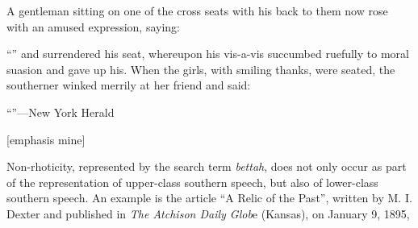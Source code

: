 \begin{ipquote}
A gentleman sitting on one of the cross seats with his back to them now rose with an amused expression, saying:

“” and surrendered his seat, whereupon his vis-a-vis succumbed ruefully to moral suasion and gave up his. When the girls, with smiling thanks, were seated, the southerner winked merrily at her friend and said:

{“”—New York Herald

\raggedleft
{[emphasis mine]}\\
}
\end{ipquote}

Non-rhoticity, represented by the search term \emph{bettah}, does not only occur as part of the representation of upper-class southern speech, but also of lower-class southern speech. An example is the article “A Relic of the Past”, written by M. I. Dexter and published in \emph{The Atchison Daily Glob}e (Kansas), on January 9, 1895,
